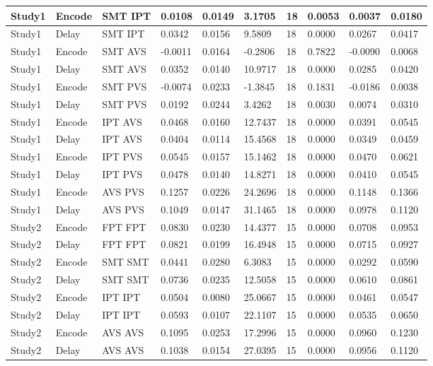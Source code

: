 \begin{table}[!hbt]
\begin{tabular}[0.2em]{@{}llllllllll@{}}
Study1 & Encode & SMT IPT & 0.0108 & 0.0149 & 3.1705 & 18 & 0.0053 & 0.0037 & 0.0180 \\\midrule
Study1 & Delay & SMT IPT & 0.0342 & 0.0156 & 9.5809 & 18 & 0.0000 & 0.0267 & 0.0417 \\\midrule
Study1 & Encode & SMT AVS & -0.0011 & 0.0164 & -0.2806 & 18 & 0.7822 & -0.0090 & 0.0068 \\\midrule
Study1 & Delay & SMT AVS & 0.0352 & 0.0140 & 10.9717 & 18 & 0.0000 & 0.0285 & 0.0420 \\\midrule
Study1 & Encode & SMT PVS & -0.0074 & 0.0233 & -1.3845 & 18 & 0.1831 & -0.0186 & 0.0038 \\\midrule
Study1 & Delay & SMT PVS & 0.0192 & 0.0244 & 3.4262 & 18 & 0.0030 & 0.0074 & 0.0310 \\\midrule
Study1 & Encode & IPT AVS & 0.0468 & 0.0160 & 12.7437 & 18 & 0.0000 & 0.0391 & 0.0545 \\\midrule
Study1 & Delay & IPT AVS & 0.0404 & 0.0114 & 15.4568 & 18 & 0.0000 & 0.0349 & 0.0459 \\\midrule
Study1 & Encode & IPT PVS & 0.0545 & 0.0157 & 15.1462 & 18 & 0.0000 & 0.0470 & 0.0621 \\\midrule
Study1 & Delay & IPT PVS & 0.0478 & 0.0140 & 14.8271 & 18 & 0.0000 & 0.0410 & 0.0545 \\\midrule
Study1 & Encode & AVS PVS & 0.1257 & 0.0226 & 24.2696 & 18 & 0.0000 & 0.1148 & 0.1366 \\\midrule
Study1 & Delay & AVS PVS & 0.1049 & 0.0147 & 31.1465 & 18 & 0.0000 & 0.0978 & 0.1120 \\\midrule
Study2 & Encode & FPT FPT & 0.0830 & 0.0230 & 14.4377 & 15 & 0.0000 & 0.0708 & 0.0953 \\\midrule
Study2 & Delay & FPT FPT & 0.0821 & 0.0199 & 16.4948 & 15 & 0.0000 & 0.0715 & 0.0927 \\\midrule
Study2 & Encode & SMT SMT & 0.0441 & 0.0280 & 6.3083 & 15 & 0.0000 & 0.0292 & 0.0590 \\\midrule
Study2 & Delay & SMT SMT & 0.0736 & 0.0235 & 12.5058 & 15 & 0.0000 & 0.0610 & 0.0861 \\\midrule
Study2 & Encode & IPT IPT & 0.0504 & 0.0080 & 25.0667 & 15 & 0.0000 & 0.0461 & 0.0547 \\\midrule
Study2 & Delay & IPT IPT & 0.0593 & 0.0107 & 22.1107 & 15 & 0.0000 & 0.0535 & 0.0650 \\\midrule
Study2 & Encode & AVS AVS & 0.1095 & 0.0253 & 17.2996 & 15 & 0.0000 & 0.0960 & 0.1230 \\\midrule
Study2 & Delay & AVS AVS & 0.1038 & 0.0154 & 27.0395 & 15 & 0.0000 & 0.0956 & 0.1120 \\\midrule

\end{tabular}
\end{table}

